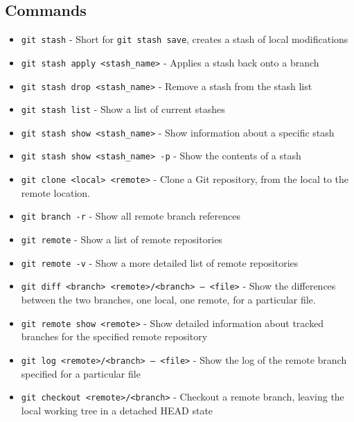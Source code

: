 \subsection{Commands}
\begin{itemize}

\item\texttt{git stash} - Short for \texttt{git stash save}, creates a stash of local modifications

\item\texttt{git stash apply <stash\_name>} - Applies a stash back onto a branch

\item\texttt{git stash drop <stash\_name>} - Remove a stash from the stash list

\item\texttt{git stash list} - Show a list of current stashes

\item\texttt{git stash show <stash\_name>} - Show information about a specific stash

\item\texttt{git stash show <stash\_name> -p} - Show the contents of a stash

\item\texttt{git clone <local> <remote>} - Clone a Git repository, from the local to the remote location.

\item\texttt{git branch -r} - Show all remote branch references

\item\texttt{git remote} - Show a list of remote repositories

\item\texttt{git remote -v} - Show a more detailed list of remote repositories

\item\texttt{git diff <branch> <remote>/<branch> -- <file>} - Show the differences between the two branches, one local, one remote, for a particular file.

\item\texttt{git remote show <remote>} - Show detailed information about tracked branches for the specified remote repository

\item\texttt{git log <remote>/<branch> -- <file>} - Show the log of the remote branch specified for a particular file

\item\texttt{git checkout <remote>/<branch>} - Checkout a remote branch, leaving the local working tree in a detached HEAD state


\end{itemize}
